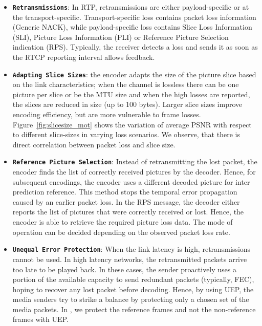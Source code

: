 \begin{itemize}
\setlength{\itemsep}{0pt}

  \item \textbf{\texttt{Retransmissions}}: In RTP, retransmissions are either
  payload-specific or at the transport-specific. Transport-specific loss
  contains packet loss information (Generic NACK), while payload-specific loss
  contains Slice Loss Information (SLI), Picture Loss Information (PLI) or
  Reference Picture Selection indication (RPS). Typically, the receiver
  detects a loss and sends it as soon as the RTCP reporting interval allows
  feedback.

  \item \textbf{\texttt{Adapting Slice Sizes}}: the encoder adapts the size of
  the picture slice based on the link characteristics; when the channel is
  lossless there can be one picture per slice or be the MTU size and when the
  high losses are reported, the slices are reduced in size (up to 100 bytes).
  Larger slice sizes improve encoding efficiency, but are more vulnerable to
  frame losses. Figure~\ref{fig:slicesize_mot} shows the variation of average
  PSNR with respect to different slice-sizes in varying loss scenarios. We
  observe, that there is direct correlation between packet loss and slice
  size.

  \item \textbf{\texttt{Reference Picture Selection}}: Instead of
  retransmitting the lost packet, the encoder finds the list of correctly
  received pictures by the decoder. Hence, for subsequent encodings, the
  encoder uses a different decoded picture for inter prediction reference.
  This method stops the temporal error propagation caused by an earlier packet
  loss. In the RPS message, the decoder either reports the list of pictures
  that were correctly received or lost. Hence, the encoder is able to retrieve
  the required picture loss data. The mode of operation can be decided
  depending on the observed packet loss rate.

  \item \textbf{\texttt{Unequal Error Protection}}: When the link latency is
  high, retransmissions cannot be used. In high latency networks, the
  retransmitted packets arrive too late to be played back. In these cases, the
  sender proactively uses a portion of the available capacity to send
  redundant packets (typically, FEC), hoping to recover any lost packet before
  decoding. Hence, by using UEP, the media senders try to strike a balance by
  protecting only a chosen set of the media packets. In , we
  protect the reference frames and not the non-reference frames with UEP.

\end{itemize}

